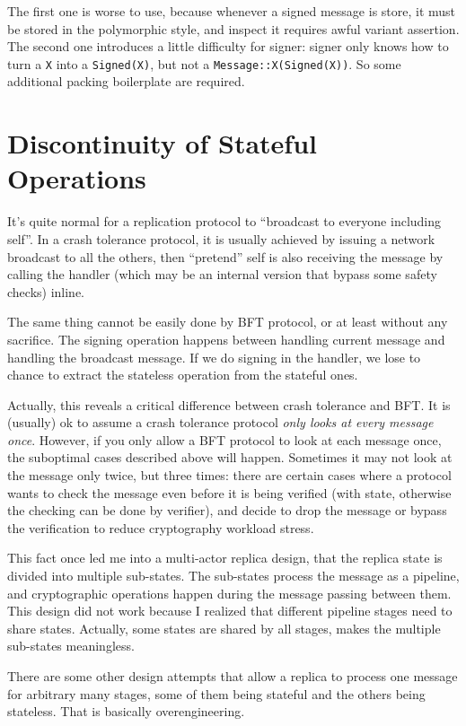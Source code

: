 \documentclass[acmsmall, nonacm, screen]{acmart}
\begin{document}
The first one is worse to use, because whenever a signed message is store, it must be stored in the polymorphic style, and inspect it requires awful variant assertion.
The second one introduces a little difficulty for signer: signer only knows how to turn a \texttt{X} into a \texttt{Signed(X)}, but not a \texttt{Message::X(Signed(X))}.
So some additional packing boilerplate are required.

\section{Discontinuity of Stateful Operations}

It's quite normal for a replication protocol to ``broadcast to everyone including self''.
In a crash tolerance protocol, it is usually achieved by issuing a network broadcast to all the others, then ``pretend'' self is also receiving the message by calling the handler (which may be an internal version that bypass some safety checks) inline.

The same thing cannot be easily done by BFT protocol, or at least without any sacrifice.
The signing operation happens between handling current message and handling the broadcast message.
If we do signing in the handler, we lose to chance to extract the stateless operation from the stateful ones.

Actually, this reveals a critical difference between crash tolerance and BFT.
It is (usually) ok to assume a crash tolerance protocol \emph{only looks at every message once}.
However, if you only allow a BFT protocol to look at each message once, the suboptimal cases described above will happen.
Sometimes it may not look at the message only twice, but three times: there are certain cases where a protocol wants to check the message even before it is being verified (with state, otherwise the checking can be done by verifier), and decide to drop the message or bypass the verification to reduce cryptography workload stress.

This fact once led me into a multi-actor replica design, that the replica state is divided into multiple sub-states.
The sub-states process the message as a pipeline, and cryptographic operations happen during the message passing between them.
This design did not work because I realized that different pipeline stages need to share states.
Actually, some states are shared by all stages, makes the multiple sub-states meaningless.

There are some other design attempts that allow a replica to process one message for arbitrary many stages, some of them being stateful and the others being stateless.
That is basically overengineering.
\end{document}
